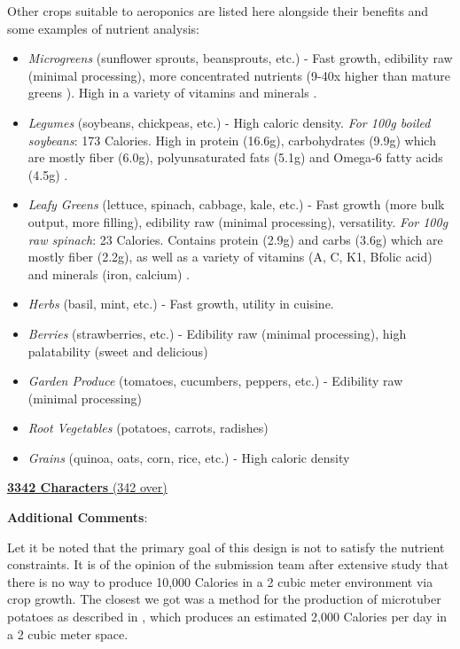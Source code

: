 \documentclass{report}
\begin{document}
Other crops suitable to aeroponics are listed here alongside their benefits and some examples of nutrient analysis:
\begin{itemize}
    \item \textit{Microgreens} (sunflower sprouts, beansprouts, etc.) - Fast growth, edibility raw (minimal processing), more concentrated nutrients (9-40x higher than mature greens \cite{microgreens2}). High in a variety of vitamins and minerals \cite{microgreens1}.
    \item \textit{Legumes} (soybeans, chickpeas, etc.) - High caloric density. \textit{For 100g boiled soybeans}: 173 Calories. High in protein (16.6g), carbohydrates (9.9g) which are mostly fiber (6.0g), polyunsaturated fats (5.1g) and Omega-6 fatty acids (4.5g) \cite{soybeans}.
    \item \textit{Leafy Greens} (lettuce, spinach, cabbage, kale, etc.) - Fast growth (more bulk output, more filling), edibility raw (minimal processing), versatility. \textit{For 100g raw spinach}: 23 Calories. Contains protein (2.9g) and carbs (3.6g) which are mostly fiber (2.2g), as well as a variety of vitamins (A, C, K1, Bfolic acid) and minerals (iron, calcium) \cite{spinach}. 
    \item \textit{Herbs} (basil, mint, etc.) - Fast growth, utility in cuisine.
    \item \textit{Berries} (strawberries, etc.) - Edibility raw (minimal processing), high palatability (sweet and delicious)
    \item \textit{Garden Produce} (tomatoes, cucumbers, peppers, etc.) - Edibility raw (minimal processing)
    \item \textit{Root Vegetables} (potatoes, carrots, radishes)
    \item \textit{Grains} (quinoa, oats, corn, rice, etc.) - High caloric density
\end{itemize}

\uline{\textbf{3342 Characters} (342 over)}

\textbf{Additional Comments}:

Let it be noted that the primary goal of this design is not to satisfy the nutrient constraints. It is of the opinion of the submission team after extensive study that there is no way to produce 10,000 Calories in a 2 cubic meter environment via crop growth. The closest we got was a method for the production of microtuber potatoes as described in \cite{minituber}, which produces an estimated 2,000 Calories per day in a 2 cubic meter space.
\end{document}
